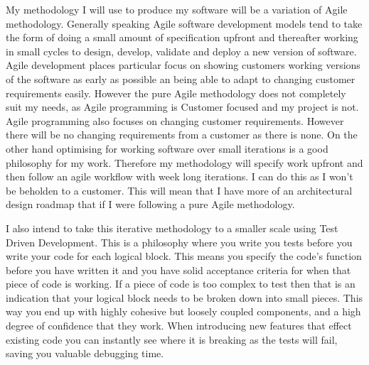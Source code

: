 My methodology I will use to produce my software will be a variation of
Agile methodology. Generally speaking Agile software development models tend to take
the form of doing a small amount of specification upfront and thereafter working
in small cycles to design, develop, validate and deploy a new version of
software. Agile development places particular focus on showing customers working
versions of the software as early as possible an being able to adapt to changing
customer requirements easily. \cite{fowler2001agile}
However the pure Agile methodology does not completely suit my needs, as Agile
programming is Customer focused and my project is not. Agile programming also
focuses on changing customer requirements. However there will be no changing
requirements from a customer as there is none. On the other hand optimising for
working software over small iterations is a good philosophy for my work.
Therefore my methodology will specify work upfront and then follow an agile
workflow with week long iterations. I can do this as I won't be beholden to a
customer. This will mean that I have more of an architectural design roadmap
that if I were following a pure Agile methodology.

I also intend to take this iterative methodology to a smaller scale using Test
Driven Development. \cite{beck2003test} This is a philosophy where you write you
tests before you write your code for each logical block. This means you specify
the code's function before you have written it and you have solid acceptance
criteria for when that piece of code is working. If a piece of code is too
complex to test then that is an indication that your logical block needs to be
broken down into small pieces. This way you end up with highly cohesive but
loosely coupled components, and a high degree of confidence that they work.
When introducing new features that effect existing code you can instantly see
where it is breaking as the tests will fail, saving you valuable debugging time.

